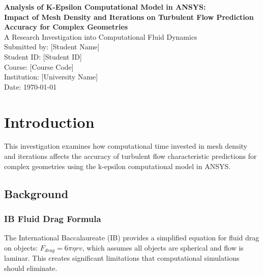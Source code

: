 \documentclass[12pt,a4paper]{article}
\begin{document}
\begin{titlepage}
\centering
\vspace*{2cm}
{\LARGE\bfseries Analysis of K-Epsilon Computational Model in ANSYS:\\[0.5cm] 
Impact of Mesh Density and Iterations on Turbulent Flow Prediction Accuracy for Complex Geometries}\\[2cm]

{\large A Research Investigation into Computational Fluid Dynamics}\\[1.5cm]

{\large Submitted by: [Student Name]}\\[0.5cm]
{\large Student ID: [Student ID]}\\[0.5cm]
{\large Course: [Course Code]}\\[0.5cm]
{\large Institution: [University Name]}\\[1.5cm]

{\large Date: \today}\\[2cm]

\vfill
\end{titlepage}

\newpage
\tableofcontents
\newpage

\listoffigures
\newpage

\listoftables
\newpage

\section{Introduction}

This investigation examines how computational time invested in mesh density and iterations affects the accuracy of turbulent flow characteristic predictions for complex geometries using the k-epsilon computational model in ANSYS.

\subsection{Background}

\subsubsection{IB Fluid Drag Formula}

The International Baccalaureate (IB) provides a simplified equation for fluid drag on objects: $F_{drag} = 6\pi\eta rv$, which assumes all objects are spherical and flow is laminar. This creates significant limitations that computational simulations should eliminate.
\end{document}
